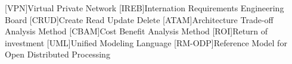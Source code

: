 [VPN]{Virtual Private Network}
[IREB]{Internation Requirements Engineering Board}
[CRUD]{Create Read Update Delete}
[ATAM]{Architecture Trade-off Analysis Method}
[CBAM]{Cost Benefit Analysis Method}
[ROI]{Return of investment}
[UML]{Unified Modeling Language}
[RM-ODP]{Reference Model for Open Distributed Processing}